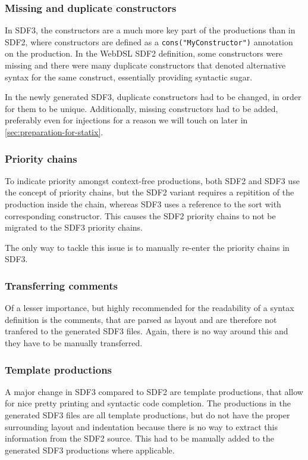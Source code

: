      \subsubsection{Missing and duplicate constructors}

        In SDF3, the constructors are a much more key part of the productions than in SDF2, where constructors are defined as a \texttt{cons("MyConstructor")} annotation on the production. In the WebDSL SDF2 definition, some constructors were missing and there were many duplicate constructors that denoted alternative syntax for the same construct, essentially providing syntactic sugar.
        
        In the newly generated SDF3, duplicate constructors had to be changed, in order for them to be unique. Additionally, missing constructors had to be added, preferably even for injections for a reason we will touch on later in \cref{sec:preparation-for-statix}.

      \subsubsection{Priority chains}

        To indicate priority amongst context-free productions, both SDF2 and SDF3 use the concept of priority chains, but the SDF2 variant requires a repitition of the production inside the chain, whereas SDF3 uses a reference to the sort with corresponding constructor. This causes the SDF2 priority chains to not be migrated to the SDF3 priority chains.
        
        The only way to tackle this issue is to manually re-enter the priority chains in SDF3.

      \subsubsection{Transferring comments}

        Of a lesser importance, but highly recommended for the readability of a syntax definition is the comments, that are parsed as layout and are therefore not tranfered to the generated SDF3 files. Again, there is no way around this and they have to be manually transferred.

      \subsubsection{Template productions}

        A major change in SDF3 compared to SDF2 are template productions, that allow for nice pretty printing and syntactic code completion. The productions in the generated SDF3 files are all template productions, but do not have the proper surrounding layout and indentation because there is no way to extract this information from the SDF2 source. This had to be manually added to the generated SDF3 productions where applicable.


